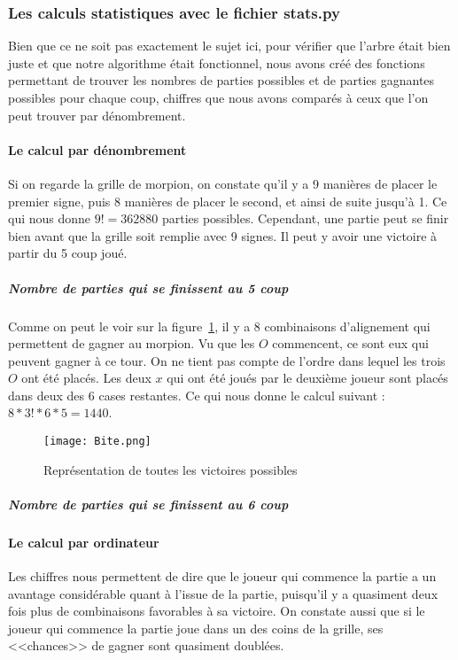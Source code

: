\documentclass{article}
\begin{document}
\subsubsection{Les calculs statistiques avec le fichier stats.py}

Bien que ce ne soit pas exactement le sujet ici, pour vérifier que l'arbre était bien juste et que notre algorithme était fonctionnel, nous avons créé des fonctions permettant de trouver les nombres de parties possibles et de parties gagnantes possibles pour chaque coup, chiffres que nous avons comparés à ceux que l'on peut trouver par dénombrement.

\paragraph{Le calcul par dénombrement}

Si on regarde la grille de morpion, on constate qu'il y a 9 manières de placer le premier signe, puis 8 manières de placer le second, et ainsi de suite jusqu'à 1. Ce qui nous donne $9! = 362880$ parties possibles. Cependant, une partie peut se finir bien avant que la grille soit remplie avec 9 signes. Il peut y avoir une victoire à partir du 5 coup joué.

\subparagraph{Nombre de parties qui se finissent au 5 coup}
Comme on peut le voir sur la figure~\ref{win}, il y a 8 combinaisons d'alignement qui permettent de gagner au morpion. Vu que les $O$ commencent, ce sont eux qui peuvent gagner à ce tour. On ne tient pas compte de l'ordre dans lequel les trois $O$ ont été placés. Les deux $x$ qui ont été joués par le deuxième joueur sont placés dans deux des 6 cases restantes. Ce qui nous donne le calcul suivant : $8*3!*6*5 = 1440$.

\begin{figure}[!h]
\centering
\texttt{[image: Bite.png]}
\caption{Représentation de toutes les victoires possibles}
\label{win}
\end{figure}

\subparagraph{Nombre de parties qui se finissent au 6 coup}


\paragraph{Le calcul par ordinateur}

Les chiffres nous permettent de dire que le joueur qui commence la partie a un avantage considérable quant à l'issue de la partie, puisqu'il y a quasiment deux fois plus de combinaisons favorables à sa victoire. On constate aussi que si le joueur qui commence la partie joue dans un des coins de la grille, ses <<chances>> de gagner sont quasiment doublées.
\end{document}
